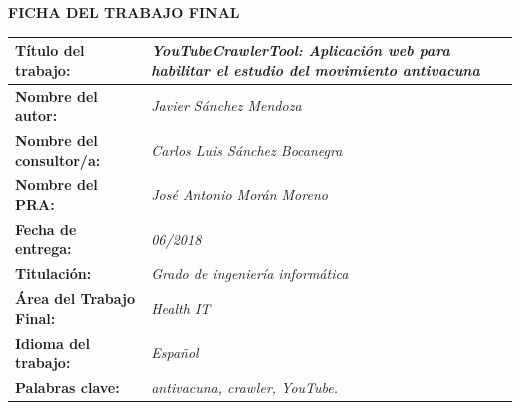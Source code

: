 \documentclass[11pt,a4paper]{article}
\begin{document}
\begin{center}
\textbf{FICHA DEL TRABAJO FINAL}
\end{center}
\begin{tabularx}{\textwidth}{|X|X|}
\hline 
\textbf{Título del trabajo:} &\cellcolor{gray!25} \textit{YouTubeCrawlerTool: Aplicación web para habilitar el estudio del movimiento antivacuna} \\ 
\hline 
\textbf{Nombre del autor:} &\cellcolor{gray!25} \textit{Javier Sánchez Mendoza} \\ 
\hline 
\textbf{Nombre del consultor/a:} &\cellcolor{gray!25} \textit{Carlos Luis Sánchez Bocanegra} \\ 
\hline 
\textbf{Nombre del PRA:} &\cellcolor{gray!25} \textit{José Antonio Morán Moreno} \\ 
\hline 
\textbf{Fecha de entrega:} &\cellcolor{gray!25} \textit{06/2018} \\ 
\hline 
\textbf{Titulación:} &\cellcolor{gray!25} \textit{Grado de ingeniería informática} \\ 
\hline 
\textbf{Área del Trabajo Final:} &\cellcolor{gray!25} \textit{Health IT} \\ 
\hline 
\textbf{Idioma del trabajo:} &\cellcolor{gray!25} \textit{Español} \\ 
\hline 
\textbf{Palabras clave:} &\cellcolor{gray!25} \textit{antivacuna, crawler, YouTube.} \\ 
\hline
\end{tabularx} 
\end{document}
